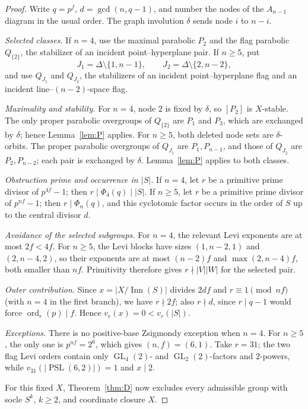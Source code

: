 \documentclass[11pt]{amsart}
\theoremstyle{definition}
\theoremstyle{remark}
\DeclareMathOperator{\Inn}{Inn}
\DeclareMathOperator{\PSL}{PSL}
\DeclareMathOperator{\GL}{GL}
\DeclareMathOperator{\ord}{ord}
\newcommand{\vp}[1]{v_{#1}}
\begin{document}
\begin{proof}
Write $q=p^f$, $d=\gcd(n,q-1)$, and number the nodes of the $A_{n-1}$
diagram in the usual order. The graph involution $\delta$ sends node $i$ to
$n-i$.

\emph{Selected classes.} If $n=4$, use the maximal parabolic $P_2$ and
the flag parabolic $Q_{\{2\}}$, the stabilizer of an incident
point--hyperplane pair. If $n\geq5$, put
\[
 J_1=\Delta\setminus\{1,n-1\},\qquad
 J_2=\Delta\setminus\{2,n-2\},
\]
and use $Q_{J_1}$ and $Q_{J_2}$, the stabilizers of an incident
point--hyperplane flag and an incident line--$(n-2)$-space flag.

\emph{Maximality and stability.} For $n=4$, node $2$ is fixed by $\delta$,
so $[P_2]$ is $X$-stable. The only proper parabolic overgroups of
$Q_{\{2\}}$ are $P_1$ and $P_3$, which are exchanged by $\delta$; hence
Lemma~\ref{lem:P} applies. For $n\geq5$, both deleted node sets are
$\delta$-orbits. The proper parabolic overgroups of $Q_{J_1}$ are
$P_1,P_{n-1}$, and those of $Q_{J_2}$ are $P_2,P_{n-2}$; each pair is
exchanged by $\delta$. Lemma~\ref{lem:P} applies to both classes.

\emph{Obstruction prime and occurrence in $|S|$.} If $n=4$, let $r$ be a
primitive prime divisor of $p^{4f}-1$; then
$r\mid\Phi_4(q)\mid|S|$. If $n\geq5$, let $r$ be a primitive prime
divisor of $p^{nf}-1$; then $r\mid\Phi_n(q)$, and this cyclotomic
factor occurs in the order of $S$ up to the central divisor $d$.

\emph{Avoidance of the selected subgroups.} For $n=4$, the relevant Levi
exponents are at most $2f<4f$. For $n\geq5$, the Levi blocks have sizes
$(1,n-2,1)$ and $(2,n-4,2)$, so their exponents are at most
$(n-2)f$ and $\max(2,n-4)f$, both smaller than $nf$. Primitivity therefore
gives $r\nmid|V||W|$ for the selected pair.

\emph{Outer contribution.} Since $x=|X/\Inn(S)|$ divides $2df$ and
$r\equiv1\pmod{nf}$ (with $n=4$ in the first branch), we have
$r\nmid2f$; also $r\nmid d$, since $r\mid q-1$ would force
$\ord_r(p)\mid f$. Hence $\vp{r}(x)=0<\vp{r}(|S|)$.

\emph{Exceptions.} There is no positive-base Zsigmondy exception when
$n=4$. For $n\geq5$, the only one is $p^{nf}=2^6$, which gives
$(n,f)=(6,1)$. Take $r=31$; the two flag Levi orders contain only
$\GL_4(2)$- and $\GL_2(2)$-factors and $2$-powers, while
$\vp{31}(|\PSL(6,2)|)=1$ and $x\mid2$.

For this fixed $X$, Theorem~\ref{thm:D} now excludes every admissible group
with socle $S^k$, $k\geq2$, and coordinate closure $X$.
\end{proof}
\end{document}
